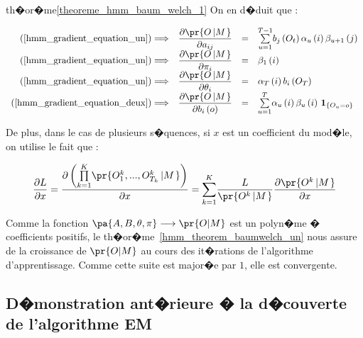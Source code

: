 \begin{xdemo}{th�or�me}{\ref{theoreme_hmm_baum_welch_1}}
On en d�duit que :%

        $$
        \begin{array}
        [c]{rrcl}%
            (\ref{hmm_gradient_equation_un})\Longrightarrow & %
            \dfrac{\partial \pr{  O\left|  M\right.  }  }{\partial a_{ij} }%
            & = &%
            \underset{u=1}{\overset{T-1}{\sum}}b_{j}\left(O_{t}\right) 
                     \alpha _{u}\left(  i\right)  \beta_{u+1}\left(  j\right)
        \\
            (\ref{hmm_gradient_equation_un})\Longrightarrow & %
            \dfrac{\partial \pr{  O\left|  M\right.  }  }{\partial\pi_{i}}%
            & = &%
            \beta_{1}\left(  i\right)
        \\
            (\ref{hmm_gradient_equation_un})\Longrightarrow & %
            \dfrac{\partial \pr{  O\left|  M\right.  }  }{\partial\theta_{i}}%
            & = & %
            \alpha_{T}\left(  i\right)  b_{i}\left(  O_{T}\right)
        \\
            (\ref{hmm_gradient_equation_deux})\Longrightarrow &%
            \dfrac{\partial \pr{   O\left|  M\right.  }  }{\partial b_{i}\left( o\right) }%
            & = &%
            \underset{u=1}{\overset{T}{\sum}}\alpha_{u}\left( i\right)\beta_{u}
                \left(  i\right)  \,\mathbf{1}_{\left\{  O_{u}=o\right\}  }%
        \end{array}
        $$

De plus, dans le cas de plusieurs s�quences, si $x$ est un coefficient du mod�le, on utilise le fait que :

        $$
        \dfrac{\partial L}{\partial x}=\dfrac{\partial\left(  \underset{k=1}{\overset{K}{\prod}} \pr{
         O_{1}^{k},...,O_{T_{k}}^{k}\left|  M\right.
        }  \right)  }{\partial x}=\underset{k=1}{\overset{K}{ {\displaystyle\sum} }}\dfrac{L}
        { \pr{  O^{k}\left|  M\right.  }
        }\dfrac{\partial \pr{ O^{k}\left|  M\right.  }  }{\partial x}
        $$

Comme la fonction $\pa{A,B,\theta,\pi} \longrightarrow \pr{O|M}$ est un polyn�me � coefficients positifs, le th�or�me~\ref{hmm_theorem_baumwelch_un} nous assure de la croissance de $\pr{O|M}$ au cours des it�rations de l'algorithme d'apprentissage. Comme cette suite est major�e par $1$, elle est convergente.

\end{xdemo}




\subsection{D�monstration ant�rieure � la d�couverte de l'algorithme EM}
\label{hmm_demo_em_em}

